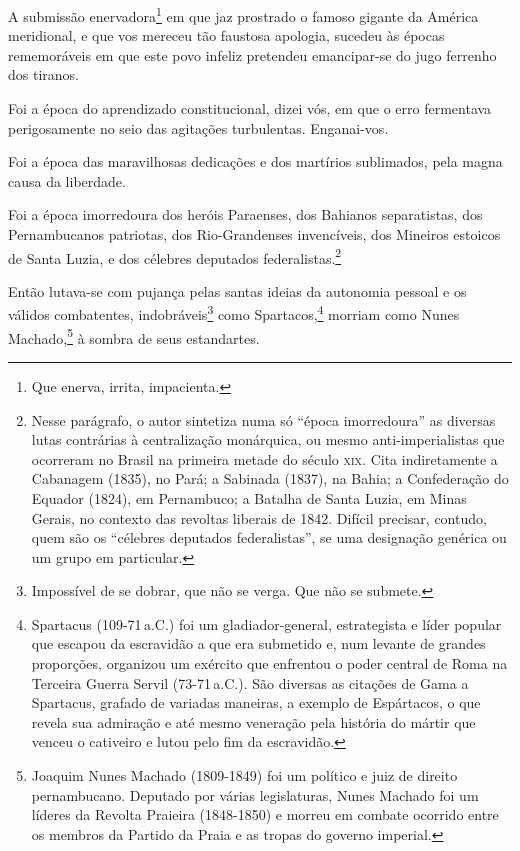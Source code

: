 A submissão enervadora\footnote{Que enerva, irrita, impacienta.} em
que jaz prostrado o famoso gigante da América meridional, e que vos
mereceu tão faustosa apologia, sucedeu às épocas rememoráveis em que
este povo infeliz pretendeu emancipar-se do jugo ferrenho dos tiranos.

Foi a época do aprendizado constitucional, dizei vós, em que o erro
fermentava perigosamente no seio das agitações turbulentas. Enganai-vos.

Foi a época das maravilhosas dedicações e dos martírios sublimados, pela
magna causa da liberdade.

Foi a época imorredoura dos heróis Paraenses, dos Bahianos separatistas,
dos Pernambucanos patriotas, dos Rio-Grandenses invencíveis, dos
Mineiros estoicos de Santa Luzia, e dos célebres deputados
federalistas.\footnote{Nesse parágrafo, o autor sintetiza numa só
  ``época imorredoura'' as diversas lutas contrárias à centralização
  monárquica, ou mesmo anti-imperialistas que ocorreram no Brasil na
  primeira metade do século \textsc{xix}. Cita indiretamente a Cabanagem (1835),
  no Pará; a Sabinada (1837), na Bahia; a Confederação do Equador
  (1824), em Pernambuco; a Batalha de Santa Luzia, em Minas Gerais, no
  contexto das revoltas liberais de 1842. Difícil precisar, contudo,
  quem são os ``célebres deputados federalistas'', se uma designação
  genérica ou um grupo em particular.}

Então lutava-se com pujança pelas santas ideias da autonomia pessoal e
os válidos combatentes, indobráveis\footnote{Impossível de se dobrar,
  que não se verga. Que não se submete.} como Spartacos,\footnote{
  Spartacus (109-71\,a.C.) foi um gladiador-general, estrategista e
  líder popular que escapou da escravidão a que era submetido e, num
  levante de grandes proporções, organizou um exército que enfrentou o
  poder central de Roma na Terceira Guerra Servil (73-71\,a.C.). São
  diversas as citações de Gama a Spartacus, grafado de variadas
  maneiras, a exemplo de Espártacos, o que revela sua admiração e até
  mesmo veneração pela história do mártir que venceu o cativeiro e lutou
  pelo fim da escravidão.}\label{spartacus} morriam como Nunes Machado,\footnote{
  Joaquim Nunes Machado (1809-1849) foi um político e juiz de direito
  pernambucano. Deputado por várias legislaturas, Nunes Machado foi um
  líderes da Revolta Praieira (1848-1850) e morreu em combate ocorrido
  entre os membros da Partido da Praia e as tropas do governo imperial.}
à sombra de seus estandartes.

